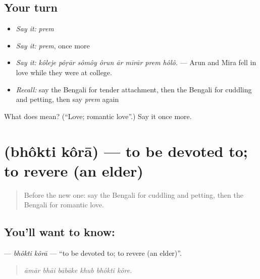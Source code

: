 \subsection*{Your turn}
\begin{itemize}
\raggedright
  \item \emph{Say it:} \emph{prem}
  \item \emph{Say it:} \emph{prem}, once more
  \item \emph{Say it:} \emph{kôleje pôṛār sômôy ôrun ār mīrār prem hôlô.} — Arun and Mira fell in love while they were at college.
  \item \emph{Recall:} say the Bengali for tender attachment, then the Bengali for cuddling and petting, then say \emph{prem} again
\end{itemize}

\begin{tcolorbox}[breakable,colback=teal!4,colframe=teal!35!black,title={Before you move on}]
What does  mean? (\textquotedblleft{}Love; romantic love\textquotedblright{}.) Say it once more.
\end{tcolorbox}
\section[\texorpdfstring{\bn{ভক্তি} \bn{করা} (bhôkti kôrā)}{ভক্তি করা (bhôkti kôrā)}]{  (bhôkti kôrā) — to be devoted to; to revere (an elder)}

\label{lesson:BN-C449-bhokti-kora}



\begin{quote}
Before the new one: say the Bengali for cuddling and petting, then the Bengali for romantic love.
\end{quote}

\subsection*{You'll want to know:  }
\textbf{ } — \emph{bhôkti kôrā} — \textquotedblleft{}to be devoted to; to revere (an elder)\textquotedblright{}.

\begin{quote}
     
\end{quote}

\begin{quote}
\emph{āmār bhāi bābāke khub bhôkti kôre.}
\end{quote}

